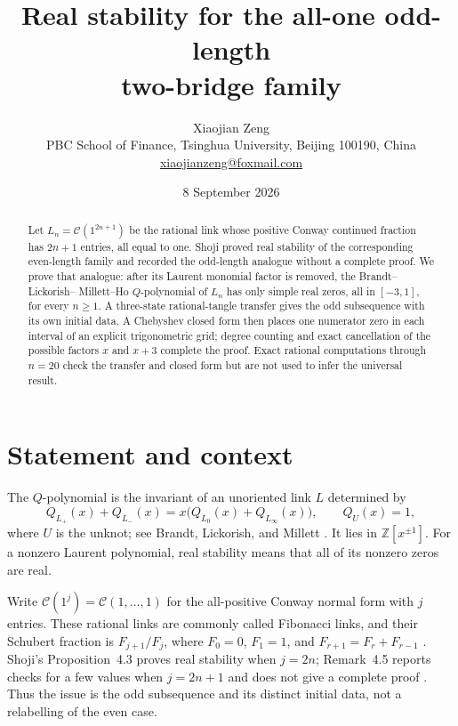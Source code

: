 \documentclass[11pt]{article}
\title{Real stability for the all-one odd-length\\two-bridge family}
\author{Xiaojian Zeng\\
  \small PBC School of Finance, Tsinghua University, Beijing 100190, China\\
  \small \href{mailto:xiaojianzeng@foxmail.com}{xiaojianzeng@foxmail.com}}
\date{8 September 2026}
\newcommand{\Z}{\mathbb Z}
\begin{document}
\maketitle

\begin{abstract}
Let $L_n=\mathcal C(1^{2n+1})$ be the rational link whose positive
Conway continued fraction has $2n+1$ entries, all equal to one.  Shoji
proved real stability of the corresponding even-length family and recorded
the odd-length analogue without a complete proof.  We prove that analogue:
after its Laurent monomial factor is removed, the Brandt--Lickorish--
Millett--Ho $Q$-polynomial of $L_n$ has only simple real zeros, all in
$[-3,1]$, for every $n\geq1$.  A three-state rational-tangle transfer gives
the odd subsequence with its own initial data.  A Chebyshev closed form then
places one numerator zero in each interval of an explicit trigonometric grid;
degree counting and exact cancellation of the possible factors $x$ and
$x+3$ complete the proof.  Exact rational computations through $n=20$ check
the transfer and closed form but are not used to infer the universal result.
\end{abstract}

\section{Statement and context}

The $Q$-polynomial is the invariant of an unoriented link $L$ determined by
\begin{equation}\label{eq:skein}
 Q_{L_+}(x)+Q_{L_-}(x)
   =x\bigl(Q_{L_0}(x)+Q_{L_\infty}(x)\bigr),
 \qquad Q_U(x)=1,
\end{equation}
where $U$ is the unknot; see Brandt, Lickorish, and Millett
\cite{BrandtLickorishMillett1986}.  It lies in $\Z[x^{\pm1}]$.  For a
nonzero Laurent polynomial, real stability means that all of its nonzero
zeros are real.

Write $\mathcal C(1^j)=\mathcal C(1,\ldots,1)$ for the all-positive Conway
normal form with $j$ entries.  These rational links are commonly called
Fibonacci links, and their Schubert fraction is $F_{j+1}/F_j$, where
$F_0=0$, $F_1=1$, and $F_{r+1}=F_r+F_{r-1}$
\cite{KoseleffPecker2010}.  Shoji's Proposition~4.3 proves real stability
when $j=2n$; Remark~4.5 reports checks for a few values when $j=2n+1$ and
does not give a complete proof \cite{Shoji2026}.  Thus the issue is the odd
subsequence and its distinct initial data, not a relabelling of the even
case.
\end{document}
